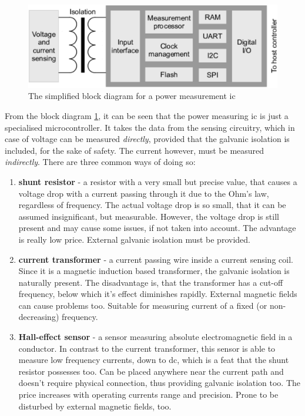 \documentclass[journal]{IEEEtran}
\begin{document}
\begin{figure}[ht!]
\centering
\includegraphics[width=1\linewidth,angle=0]{measurement_IC_diag}
\caption{The simplified block diagram for a power measurement \gls{ic}}\label{f:meas_IC_diag}
\end{figure}

From the block diagram \ref{f:meas_IC_diag}, it can be seen that the power measuring \gls{ic} is just a specialised microcontroller. It takes the data from the sensing circuitry, which in case of voltage can be measured \textit{directly}, provided that the galvanic isolation is included, for the sake of safety. The current however, must be measured \textit{indirectly}. There are three common ways \cite{srinivasan2015composite} of doing so:

\begin{enumerate}
\item \textbf{shunt resistor} - a resistor with a very small but precise value, that causes a voltage drop with a current passing through it due to the Ohm's law, regardless of frequency. The actual voltage drop is so small, that it can be assumed insignificant, but measurable. However, the voltage drop is still present and may cause some issues, if not taken into account. The advantage is really low price. External galvanic isolation must be provided.
\item \textbf{current transformer} - a current passing wire inside a current sensing coil. Since it is a magnetic induction based transformer, the galvanic isolation is naturally present. The disadvantage is, that the transformer has a cut-off frequency, below which it's effect diminishes rapidly. External magnetic fields can cause problems too. Suitable for measuring current of a fixed (or non-decreasing) frequency.
\item \textbf{Hall-effect sensor} - a sensor measuring absolute electromagnetic field in a conductor. In contrast to the current transformer, this sensor is able to measure low frequency currents, down to \gls{dc}, which is a feat that the shunt resistor possesses too. Can be placed anywhere near the current path and doesn't require physical connection, thus providing galvanic isolation too. The price increases with operating currents range and precision. Prone to be disturbed by external magnetic fields, too.
\end{enumerate}
\end{document}
